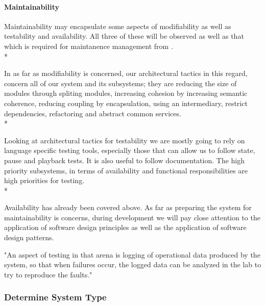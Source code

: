 \documentclass[11pt]{article}
\begin{document}

\paragraph{Maintainability}

Maintainability may encapsulate some aspects of modifiability as well as testability and availability. All three of these will be observed as well as that which is required for maintanence management from \cite{Book:1}. \\*

In as far as modifiability is concerned, our architectural tactics in this regard, concern all of our system and its subsystems; they are reducing the size of modules through spliting modules, increasing cohesion by increasing semantic coherence, reducing coupling by encapsulation, using an intermediary, restrict dependencies, refactoring and abstract common services. \\*

Looking at architectural tactics for testability we are mostly going to rely on language specific testing tools, especially those that can allow us to follow state, pause and playback tests. It is also useful to follow documentation. The high priority subsystems, in terms of availability and functional responsibilities are high priorities for testing. \\*

Availability has already been covered above. As far as preparing the system for maintainability is concerns, during development we will pay close attention to the application of software design principles as well as the application of software design patterns.

"An aspect of testing in that arena is logging of operational data produced by the system, so that when failures occur, the logged data can be analyzed in the lab to try to reproduce the faults."\cite{Book:2}

\subsubsection{Determine System Type}
\end{document}

